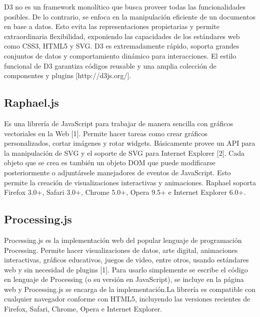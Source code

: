 D3 no es un framework monolítico que busca proveer todas las funcionalidades posibles. De lo contrario, se enfoca en la manipulación eficiente de un documentos en base a datos. Esto evita las representaciones propietarias y permite extraordinaria flexibilidad, exponiendo las capacidades de los estándares web como CSS3, HTML5 y SVG. D3 es extremadamente rápido, soporta grandes conjuntos de datos y comportamiento dinámico para interacciones. El estilo funcional de D3 garantiza códigos reusable y una amplia colección de componentes y plugins [http://d3js.org/].

\subsection{Raphael.js}

Es una librería de JavaScript para trabajar de manera sencilla con gráficos vectoriales en la Web [1]. Permite hacer tareas como crear gráficos personalizados, cortar imágenes y rotar widgets. Básicamente provee un API para la manipulación de SVG y el soporte de SVG para Internet Explorer [2]. Cada objeto que se crea es también un objeto DOM que puede modificarse posteriormente o adjuntársele manejadores de eventos de JavaScript. Esto permite la creación de visualizaciones interactivas y animaciones. Raphael soporta Firefox 3.0+, Safari 3.0+, Chrome 5.0+, Opera 9.5+ e Internet Explorer 6.0+.



\subsection{Processing.js}

Processing.js es la implementación web del popular lenguaje de programación Processing. Permite hacer visualizaciones de datos, arte digital, animaciones interactivas, gráficos educativos, juegos de video, entre otros, usando estándares web y sin necesidad de plugins [1]. Para usarlo simplemente se escribe el código en lenguaje de Processing (o su versión en JavaScript), se incluye en la página web y Processing.js se encarga de la implementación.La librería es compatible con cualquier navegador conforme con HTML5, incluyendo las versiones recientes de Firefox, Safari, Chrome, Opera e Internet Explorer.

